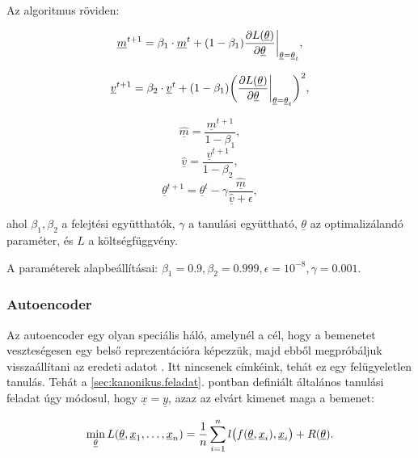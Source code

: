 \noindent
Az algoritmus röviden:

\[  \underline{m}^{t+1} = \beta_1 \cdot \underline{m}^{t} + (1-\beta_1) \dfrac{\partial { L(\underline{\theta})}}{\partial {\underline{\theta}}} \bigg\rvert_{\underline{\theta}=\underline{\theta}_t} , \]

\[  \underline{v}^{t+1} = \beta_2 \cdot \underline{v}^{t} + (1-\beta_1)\bigg( \dfrac{\partial {  L(\underline{\theta})}}{\partial { \underline{\theta}}} \bigg\rvert_{\underline{\theta}=\underline{\theta}_t} \bigg)^2  ,\]

\[  \hat{\underline{m}} = \dfrac{\underline{m}^{t+1}}{1 - \beta_1} , \]
\[  \hat{\underline{v}} = \dfrac{\underline{v}^{t+1}}{1 - \beta_2}  ,\]
\[ \underline{\theta}^{t+1} = \underline{\theta}^{t} - \gamma \dfrac{\hat{\underline{m}}}{\hat{\underline{v}} + \epsilon}   ,\]

\noindent
ahol $ \beta_1, \beta_2 $ a felejtési együtthatók, $ \gamma $ a tanulási együttható,
$ \underline{\theta} $ az optimalizálandó paraméter, és $ L $ a költségfüggvény.

\noindent
A paraméterek alapbeállításai: 
$ \beta_1=0.9, \beta_2=0.999, \epsilon=10^{-8}, \gamma=0.001 .$



\subsubsection{Autoencoder}

Az autoencoder egy olyan speciális háló, amelynél a cél, hogy a bemenetet veszteségesen egy belső reprezentációra képezzük, majd ebből megpróbáljuk visszaállítani az eredeti adatot \cite{autoencoder1, autoencoder2}. Itt nincsenek címkéink, tehát ez egy felügyeletlen tanulás.
Tehát a \ref{sec:kanonikus.feladat}. pontban definiált általános tanulási feladat úgy módosul, hogy $ \underline{x} = \underline{y} $, azaz az elvárt kimenet maga a bemenet:


\[ 
\min\limits_{\underline{\theta}} L(\underline{\theta}, \underline{x}_1, \dots, \underline{x}_n) = \frac{1}{n}  \sum\limits_{{i}=1}^{n} l\big(f(\underline{\theta}, \underline{x}_i), \underline{x}_i\big) + R(\underline{\theta}) .
\]






